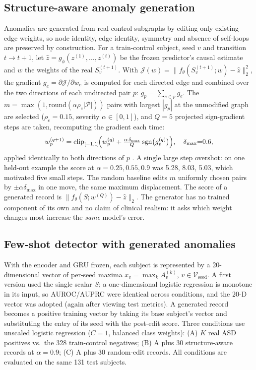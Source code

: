 \documentclass[conference]{IEEEtran}
\begin{document}
\subsection{Structure-aware anomaly generation}
Anomalies are generated from real control subgraphs by editing only existing edge weights, so node identity, edge identity, symmetry and absence of self-loops are preserved by construction. For a train-control subject, seed $v$ and transition $t\to t{+}1$, let $\hat z=g_\phi(z^{(1)},\dots,z^{(t)})$ be the frozen predictor's causal estimate and $w$ the weights of the real $S_v^{(t+1)}$. With $\mathcal{J}(w)=\|f_\theta(S_v^{(t+1)};w)-\hat z\|_2^2$, the gradient $g_e=\partial\mathcal{J}/\partial w_e$ is computed for each directed edge and combined over the two directions of each undirected pair $p$: $g_p=\sum_{e\in p}g_e$. The $m=\max(1,\mathrm{round}(\alpha\rho_e|\mathcal{P}|))$ pairs with largest $|g_p|$ at the unmodified graph are selected ($\rho_e{=}0.15$, severity $\alpha\in[0,1]$), and $Q{=}5$ projected sign-gradient steps are taken, recomputing the gradient each time:
\begin{equation}
w_p^{(q+1)}=\mathrm{clip}_{[-1,1]}\!\Bigl(w_p^{(q)}+\tfrac{\alpha\,\delta_{\max}}{Q}\,\mathrm{sgn}\bigl(g^{(q)}_p\bigr)\Bigr),\quad \delta_{\max}{=}0.6 ,
\label{eq:pgd}
\end{equation}
applied identically to both directions of $p$ \cite{madry2018,xu2019topology}. A single large step overshot: on one held-out example the score at $\alpha=0.25,0.55,0.9$ was 5.28, 8.03, 5.03, which motivated five small steps. The random baseline edits $m$ uniformly chosen pairs by $\pm\alpha\delta_{\max}$ in one move, the same maximum displacement. The score of a generated record is $\|f_\theta(S;w^{(Q)})-\hat z\|_2$. The generator has no trained component of its own and no claim of clinical realism: it asks which weight changes most increase the \emph{same} model's error.

\subsection{Few-shot detector with generated anomalies}
With the encoder and GRU frozen, each subject is represented by a 20-dimensional vector of per-seed maxima $x_v=\max_k A^{(k)}_v$, $v\in\mathcal{V}_{\mathrm{seed}}$. A first version used the single scalar $S$; a one-dimensional logistic regression is monotone in its input, so AUROC/AUPRC were identical across conditions, and the 20-D vector was adopted (again after viewing test metrics). A generated record becomes a positive training vector by taking its base subject's vector and substituting the entry of its seed with the post-edit score. Three conditions use unscaled logistic regression ($C{=}1$, balanced class weights): (A) $K$ real ASD positives vs.\ the 328 train-control negatives; (B) A plus 30 structure-aware records at $\alpha{=}0.9$; (C) A plus 30 random-edit records. All conditions are evaluated on the same 131 test subjects.
\end{document}
